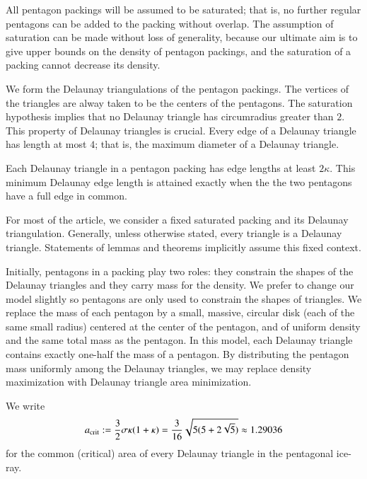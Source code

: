 All pentagon packings will be assumed to be saturated; that is, no
further regular pentagons can be added to the packing without overlap.
The assumption of saturation can be made without loss of generality,
because our ultimate aim is to give upper bounds on the density of
pentagon packings, and the saturation of a packing cannot decrease its
density.

We form the Delaunay triangulations of the pentagon packings.  The
vertices of the triangles are alway taken to be the centers of the
pentagons.  The saturation hypothesis implies that no Delaunay
triangle has circumradius greater than $2$.  This property of Delaunay
triangles is crucial.   Every edge of a Delaunay
triangle has length at most $4$; that is, the maximum diameter of
a Delaunay triangle.

Each Delaunay triangle in a pentagon packing has edge lengths at least
$2\kappa$.  This minimum Delaunay edge length is attained exactly when
the the two pentagons have a full edge in common.

For most of the article, we consider a fixed saturated packing and its
Delaunay triangulation.  Generally, unless otherwise stated,
every triangle is a  Delaunay triangle.
Statements of lemmas and theorems implicitly
assume this fixed context.

Initially, pentagons in a packing play two roles: they constrain the
shapes of the Delaunay triangles and they carry mass for the density.
We prefer to change our model slightly so pentagons are only used
to constrain the shapes of triangles.  We replace the mass of each
pentagon by a small, massive, circular disk (each of the same small
radius) centered at the center of the pentagon, and of uniform density
and the same total mass as the pentagon.  In this model, each Delaunay
triangle contains exactly one-half the mass of a pentagon.  By
distributing the pentagon mass uniformly among the Delaunay triangles,
we may replace density maximization with Delaunay triangle area
minimization.

We write 
\[
a_\text{crit} := \frac{3}{2}{ \sigma \kappa(1+\kappa)} =
\frac{3}{16}\sqrt{5(5+2\sqrt5)}\approx 1.29036
\] %
for the common (critical) area of every Delaunay triangle in the 
pentagonal ice-ray.

